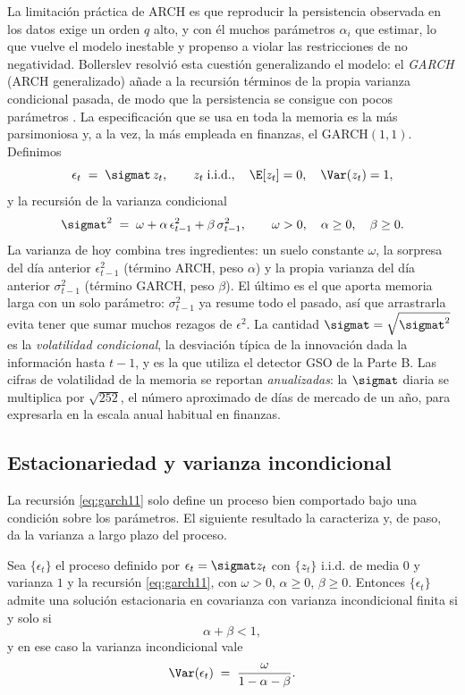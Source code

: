 La limitación práctica de ARCH es que reproducir la persistencia observada en los datos exige un orden $q$ alto, y con él muchos parámetros $\alpha_i$ que estimar, lo que vuelve el modelo inestable y propenso a violar las restricciones de no negatividad. Bollerslev resolvió esta cuestión generalizando el modelo: el \emph{GARCH} (ARCH generalizado) añade a la recursión términos de la propia varianza condicional pasada, de modo que la persistencia se consigue con pocos parámetros \cite{bollerslev1986}. La especificación que se usa en toda la memoria es la más parsimoniosa y, a la vez, la más empleada en finanzas, el GARCH$(1,1)$. Definimos
\[
\epsilon_t \;=\; \sigmat\, z_t, \qquad z_t \;\text{i.i.d.}, \quad \E[z_t] = 0, \quad \Var(z_t) = 1,
\]
y la recursión de la varianza condicional
\begin{equation}
\label{eq:garch11}
\sigmat^2 \;=\; \omega + \alpha\, \epsilon_{t-1}^2 + \beta\, \sigma_{t-1}^2,
\qquad \omega > 0, \quad \alpha \ge 0, \quad \beta \ge 0.
\end{equation}
La varianza de hoy combina tres ingredientes: un suelo constante $\omega$, la sorpresa del día anterior $\epsilon_{t-1}^2$ (término ARCH, peso $\alpha$) y la propia varianza del día anterior $\sigma_{t-1}^2$ (término GARCH, peso $\beta$). El último es el que aporta memoria larga con un solo parámetro: $\sigma_{t-1}^2$ ya resume todo el pasado, así que arrastrarla evita tener que sumar muchos rezagos de $\epsilon^2$. La cantidad $\sigmat = \sqrt{\sigmat^2}$ es la \emph{volatilidad condicional}, la desviación típica de la innovación dada la información hasta $t-1$, y es la que utiliza el detector GSO de la Parte B. Las cifras de volatilidad de la memoria se reportan \emph{anualizadas}: la $\sigmat$ diaria se multiplica por $\sqrt{252}$, el número aproximado de días de mercado de un año, para expresarla en la escala anual habitual en finanzas.

\subsection{Estacionariedad y varianza incondicional}
\label{sec:garch-estac}

La recursión \eqref{eq:garch11} solo define un proceso bien comportado bajo una condición sobre los parámetros. El siguiente resultado la caracteriza y, de paso, da la varianza a largo plazo del proceso.

\begin{teorema}
\label{teo:garch-estac}
Sea $\{\epsilon_t\}$ el proceso definido por $\epsilon_t = \sigmat z_t$ con $\{z_t\}$ i.i.d. de media $0$ y varianza $1$ y la recursión \eqref{eq:garch11}, con $\omega > 0$, $\alpha \ge 0$, $\beta \ge 0$. Entonces $\{\epsilon_t\}$ admite una solución estacionaria en covarianza con varianza incondicional finita si y solo si
\[
\alpha + \beta < 1,
\]
y en ese caso la varianza incondicional vale
\[
\Var(\epsilon_t) \;=\; \frac{\omega}{1 - \alpha - \beta}.
\]
\end{teorema}

